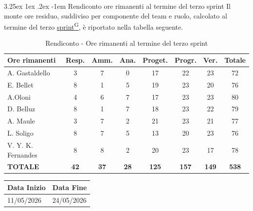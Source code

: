\documentclass[a4paper,12pt]{article}
\makeatletter
\newcounter{subsubsubsection}[subsubsection]
\renewcommand\paragraph{\@startsection{paragraph}{5}{\z@}%
  {3.25ex \@plus1ex \@minus.2ex}%
  {-1em}%
  {\normalfont\normalsize\bfseries}}
\providecommand{\glslink}[2]{\href{https://alittlebyte-19.github.io/Documentazione/glossario.html\#gls-#1}{\underline{#2}\textsuperscript{\scriptsize G}}}
\makeatother
\begin{document}
\paragraph{Rendiconto ore rimanenti al termine del terzo sprint}
Il monte ore residuo, suddiviso per componente del team e ruolo, calcolato al termine del terzo \glslink{sprint}{sprint}, è riportato nella tabella seguente.
\begin{table}[htbp]
\centering
\renewcommand{\arraystretch}{1.5} 
\begin{tabularx}{\textwidth}{|X|c|c|c|c|c|c|c|}
\hline
\textbf{Ore rimanenti} & \textbf{Resp.} & \textbf{Amm.} & \textbf{Ana.} & \textbf{Proget.} & \textbf{Progr.} & \textbf{Ver.} & \textbf{Totale} \\
\hline
A. Gastaldello & 3 & 7 & 0 & 17 & 22 & 23 & 72 \\
\hline
E. Bellet & 8 & 1 & 5 & 19 & 23 & 20 & 76 \\
\hline
A.Oloni & 4 & 6 & 7 & 17 & 23 & 23 & 80 \\
\hline
D. Belluz & 8 & 1 & 7 & 18 & 23 & 22 & 79 \\
\hline
A. Maule & 3 & 7 & 2 & 21 & 23 & 21 & 77 \\
\hline
L. Soligo & 8 & 7 & 5 & 13 & 20 & 23 & 76 \\
\hline
V. Y. K. Fernandes & 8 & 8 & 2 & 20 & 23 & 17 & 78 \\
\hline
\rowcolor{gray!20}
\textbf{TOTALE} & \textbf{42} & \textbf{37} & \textbf{28} & \textbf{125} & \textbf{157} & \textbf{149} & \textbf{538} \\
\hline
\end{tabularx}
\caption{Rendiconto - Ore rimanenti al termine del terzo sprint}
\end{table}


\newpage


\label{sec:rtb_quartoperiodo}
\begin{table}[H]
    \centering
    \renewcommand{\arraystretch}{1.5} 
    \begin{tabularx}{\textwidth}{|X|X|}
    \hline \rowcolor{Dandelion!50}
    \textbf{Data Inizio} & \textbf{Data Fine}\\
    \hline
    11/05/2026 & 24/05/2026\\
    \hline

    \end{tabularx}
\end{table}
\end{document}
